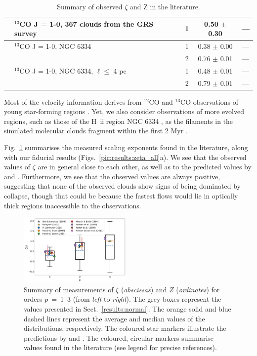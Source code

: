 \documentclass{aa}		%
\begin{document}
\begin{table}
\begin{tabular}{llccc}
        \citet{RomanDuval2011} & $^{13}$CO J = 1-0, 367 clouds  from the GRS survey & 1 & 0.50  $\pm$   0.30  &   --- \\  \hline
        \citet{Zernickel2015} & $^{13}$CO J = 1-0, NGC 6334 & 1 &  0.38 $\pm$  0.00  &   --- \\ 
                            &		 & 2 &  0.76  $\pm$    0.01 &  --- \\ 
                            & $^{13}$CO J = 1-0, NGC 6334, $\ell \leq$ 4 pc  & 1 &  0.48 $\pm$  0.01 &  --- \\
                            & & 2 &  0.79 $\pm$  0.01 &  --- 
	\end{tabular} 
	\caption{Summary of observed $\zeta$ and Z in the literature.} 
	\label{tab:discussion:summary_obs} 
\end{table} 


Most of the velocity information derives from $^{12}$CO and $^{13}$CO observations of young star-forming regions \citep[e.g., Perseus and Taurus][]{Padoan2003}.
Yet, we also consider observations of more evolved regions, such as those of the H~{\sc ii} region NGC 6334 \citep{Zernickel2015}, as the filaments in the simulated molecular clouds fragment within the first 2 Myr .

Fig.~\ref{pic:discussion:comp_observation} summarises the measured scaling exponents found in the literature, along with our fiducial results (Figs.~\ref{pic:results:zeta_all}a).
We see that the observed values of $\zeta$ are in general close to each other, as well as to the predicted values by \citet{She1994} and \citet{Boldyrev2002}. 
Furthermore, we see that the observed values are always positive, suggesting that none of the observed clouds show signs of being dominated by collapse, though that could be because the fastest flows would lie in optically thick regions inaccessible to the observations.  

\begin{figure}
	\includegraphics[width=0.49\textwidth]{compare_observations.pdf}
	\caption{Summary of measurements of $\zeta$ (\textit{abscissas}) and $Z$ (\textit{ordinates}) for orders $p$~=~1--3 (from \textit{left} to \textit{right}). The grey boxes represent the values presented in Sect.~\ref{results:normal}. The orange solid and blue dashed lines represent the average and median values of the distributions, respectively. The coloured star markers illustrate the predictions by \citet{She1994} and \citet{Boldyrev2002}. The coloured, circular markers summarise values found in the literature (see legend for precise references).
	}
	\label{pic:discussion:comp_observation}
\end{figure}
\end{document}
